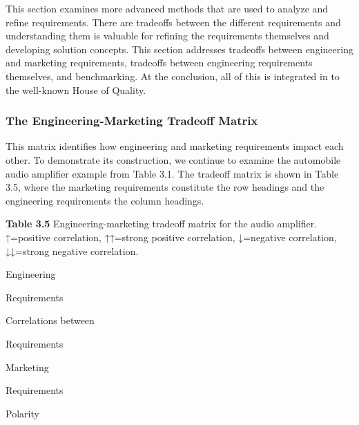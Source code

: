 This section examines more advanced methods that are used to analyze and
refine requirements. There are tradeoffs between the different
requirements and understanding them is valuable for refining the
requirements themselves and developing solution concepts. This section
addresses tradeoffs between engineering and marketing requirements,
tradeoffs between engineering requirements themselves, and benchmarking.
At the conclusion, all of this is integrated in to the well-known House
of Quality.

\subsubsection{The Engineering-Marketing Tradeoff
Matrix}\label{the-engineering-marketing-tradeoff-matrix}

This matrix identifies how engineering and marketing requirements impact
each other. To demonstrate its construction, we continue to examine the
automobile audio amplifier example from Table 3.1. The tradeoff matrix
is shown in Table 3.5, where the marketing requirements constitute the
row headings and the engineering requirements the column headings.

\textbf{Table 3.5} Engineering-marketing tradeoff matrix for the audio
amplifier. ↑=positive correlation, ↑↑=strong positive correlation,
↓=negative correlation, ↓↓=strong negative correlation.

Engineering

Requirements

Correlations between

Requirements

Marketing

Requirements

Polarity

